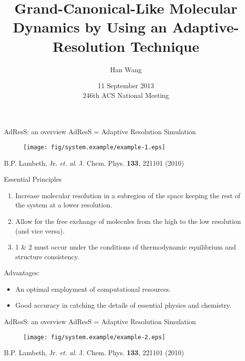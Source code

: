 \documentclass[]{beamer}
\newcommand{\redc}[1]{{\color{red} #1}}
\newcommand{\bluec}[1]{{\color{blue} #1}}
\newcommand{\whitec}[1]{{\color{white} #1}}
\begin{document}
\title[Grand-Canonical MD by AdResS]{
  Grand-Canonical-Like Molecular Dynamics  by Using an
  Adaptive-Resolution Technique
}
%
\author{Han Wang}
\date[Sept. 2013]{11 September 2013\\ 246th ACS National Meeting}
\frame{\titlepage}

\begin{frame}{AdResS: an overview}
  \redc{AdResS} = \redc{Ad}aptive \redc{Res}olution \redc{S}imulation
  \begin{figure}
    \centering 
    \texttt{[image: fig/system.example/example-1.eps]}
  \end{figure}
  \footnotesize{B.P. Lambeth, Jr. \textit{et. al.} J. Chem. Phys. \textbf{133}, 221101 (2010)}
\end{frame}

\begin{frame}{Essential Principles}
  \vfill  
  \begin{enumerate}
  \item  \redc{Increase molecular resolution} in a subregion of the space
    keeping the rest of the system at a lower resolution.
  \item  Allow for the \redc{free exchange} of molecules from the
    high to the low resolution (and vice versa).
  \item  1 \& 2 \redc{must} occur under the conditions of {thermodynamic
      equilibrium} and structure consistency.
  \end{enumerate}
  \vfill
  \bluec{Advantages}:
  \begin{itemize}
  \item An optimal employment of \redc{computational resources}.
  \item Good \redc{accuracy} in catching the details of essential physics and
    chemistry.
  \end{itemize}
  \vfill
\end{frame}

\begin{frame}{AdResS: an overview}
  \redc{AdResS} = \redc{Ad}aptive \redc{Res}olution \redc{S}imulation
  \begin{figure}
    \centering 
    \texttt{[image: fig/system.example/example-2.eps]}
  \end{figure}  
  \footnotesize{\whitec{B.P. Lambeth, Jr. \textit{et. al.} J. Chem. Phys. \textbf{133}, 221101 (2010)}}
\end{frame}
\end{document}

